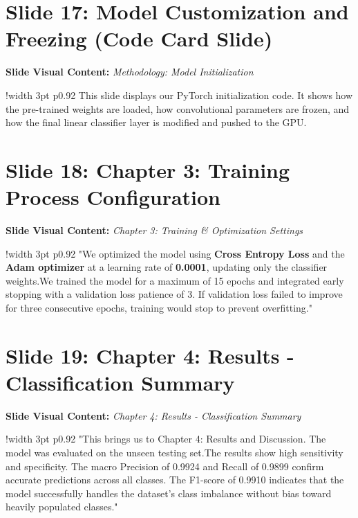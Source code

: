 \documentclass[11pt]{article}
\begin{document}
\section{Slide 17: Model Customization and Freezing (Code Card Slide)}
\textbf{Slide Visual Content:} \textit{Methodology: Model Initialization}\\ [8pt]
\noindent
\begin{tabular}{!{\color{primary}\vrule width 3pt} p{0.92\textwidth}}
  \small\color{black!80} This slide displays our PyTorch initialization code. It shows how the pre-trained weights are loaded, how convolutional parameters are frozen, and how the final linear classifier layer is modified and pushed to the GPU.
\end{tabular}
\vspace{15pt}

\section{Slide 18: Chapter 3: Training Process Configuration}
\textbf{Slide Visual Content:} \textit{Chapter 3: Training \& Optimization Settings}\\ [8pt]
\noindent
\begin{tabular}{!{\color{primary}\vrule width 3pt} p{0.92\textwidth}}
  \small\color{black!80} "We optimized the model using \textbf{Cross Entropy Loss} and the \textbf{Adam optimizer} at a learning rate of \textbf{0.0001}, updating only the classifier weights.\newline\newline We trained the model for a maximum of 15 epochs and integrated early stopping with a validation loss patience of 3. If validation loss failed to improve for three consecutive epochs, training would stop to prevent overfitting."
\end{tabular}
\vspace{15pt}

\section{Slide 19: Chapter 4: Results - Classification Summary}
\textbf{Slide Visual Content:} \textit{Chapter 4: Results - Classification Summary}\\ [8pt]
\noindent
\begin{tabular}{!{\color{primary}\vrule width 3pt} p{0.92\textwidth}}
  \small\color{black!80} "This brings us to Chapter 4: Results and Discussion. The model was evaluated on the unseen testing set.\newline\newline The results show high sensitivity and specificity. The macro Precision of 0.9924 and Recall of 0.9899 confirm accurate predictions across all classes. The F1-score of 0.9910 indicates that the model successfully handles the dataset's class imbalance without bias toward heavily populated classes."
\end{tabular}
\vspace{15pt}
\end{document}
